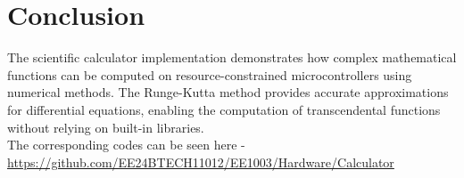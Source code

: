 \documentclass[12pt,a4paper]{article}
\begin{document}
\section{Conclusion}
The scientific calculator implementation demonstrates how complex mathematical functions can be computed on resource-constrained microcontrollers using numerical methods. The Runge-Kutta method provides accurate approximations for differential equations, enabling the computation of transcendental functions without relying on built-in libraries. \\
The corresponding codes can be seen here - \\ \href{https://github.com/EE24BTECH11012/EE1003/tree/c55818859eebe407cd8a028f4a39012ec59f1942/Hardware/Calculator}{https://github.com/EE24BTECH11012/EE1003/Hardware/Calculator}
\end{document}
